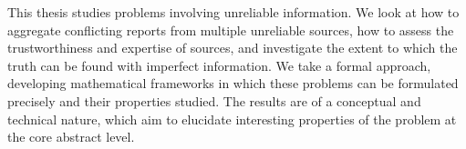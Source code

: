 

This thesis studies problems involving unreliable information. We look at how
to aggregate conflicting reports from multiple unreliable sources, how to
assess the trustworthiness and expertise of sources, and investigate the extent
to which the truth can be found with imperfect information.
%
We take a formal approach, developing mathematical frameworks in which these
problems can be formulated precisely and their properties studied. The results
are of a conceptual and technical nature, which aim to elucidate interesting
properties of the problem at the core abstract level.

